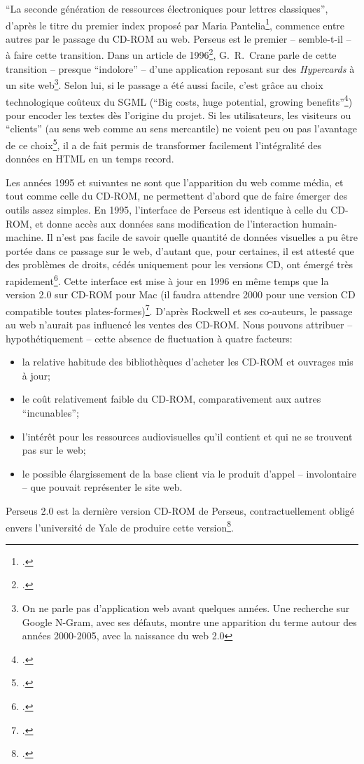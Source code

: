 \enquote{La seconde génération de ressources électroniques pour lettres classiques}, d'après le titre du premier index proposé par Maria Pantelia\footcite{pantelia_electronic_1994}, commence entre autres par le passage du CD-ROM au web. Perseus est le premier -- semble-t-il -- à faire cette transition. Dans un article de 1996\footcite{crane_building_1996}, G.~R.~Crane parle de cette transition -- presque \enquote{indolore} -- d'une application reposant sur des \textit{Hypercards} à un site web\footnote{On ne parle pas d'application web avant quelques années. Une recherche sur Google N-Gram, avec ses défauts, montre une apparition du terme autour des années 2000-2005, avec la naissance du web 2.0}. Selon lui, si le passage a été aussi facile, c'est grâce au choix technologique coûteux du SGML (\enquote{Big costs, huge potential, growing benefits}\footcite[p. 7]{crane_building_1996}) pour encoder les textes dès l'origine du projet. Si les utilisateurs, les visiteurs ou \enquote{clients} (au sens web comme au sens mercantile) ne voient peu ou pas l'avantage de ce choix\footcite[p. 8]{crane_building_1996}, il a de fait permis de transformer facilement l'intégralité des données en HTML en un temps record.

Les années 1995 et suivantes ne sont que l'apparition du web comme média, et tout comme celle du CD-ROM, ne permettent d'abord que de faire émerger des outils assez simples. En 1995, l'interface de Perseus est identique à celle du CD-ROM, et donne accès aux données sans modification de l'interaction humain-machine. Il n'est pas facile de savoir quelle quantité de données visuelles a pu être portée dans ce passage sur le web, d'autant que, pour certaines, il est attesté que des problèmes de droits, cédés uniquement pour les versions CD, ont émergé très rapidement\footcite[p.~3]{crane_building_1996}. Cette interface est mise à jour en 1996 en même temps que la version 2.0 sur CD-ROM pour Mac (il faudra attendre 2000 pour une version CD compatible toutes plates-formes)\footcite[p.~109]{rockwell_interface_2020}. D'après Rockwell et ses co-auteurs, le passage au web n'aurait pas influencé les ventes des CD-ROM. Nous pouvons attribuer -- hypothétiquement -- cette absence de fluctuation à quatre facteurs:
\begin{itemize}
    \item la relative habitude des bibliothèques d'acheter les CD-ROM et ouvrages mis à jour;
    \item le coût relativement faible du CD-ROM, comparativement aux autres \enquote{incunables};
    \item l'intérêt pour les ressources audiovisuelles qu'il contient et qui ne se trouvent pas sur le web;
    \item le possible élargissement de la base client via le produit d'appel -- involontaire -- que pouvait représenter le site web.
\end{itemize}
Perseus 2.0 est la dernière version CD-ROM de Perseus, contractuellement obligé envers l'université de Yale de produire cette version\footcite[p.~3]{crane_building_1996}. 

